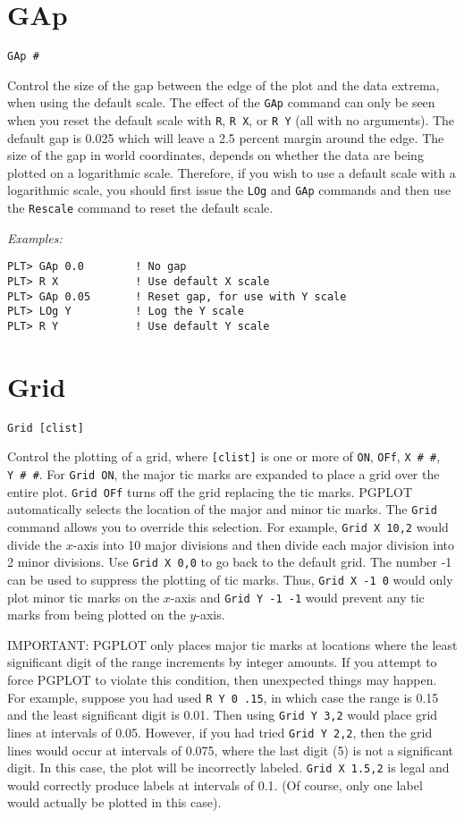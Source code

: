 \section*{GAp}
\begin{verbatim}
GAp #
\end{verbatim}
   Control the size of the gap between the edge of the plot and the
data extrema, when using the default scale.  The effect of the {\tt GAp}
command can only be seen when you reset the default scale with {\tt R},
{\tt R~X}, or {\tt R~Y} (all with no arguments).  The default gap is 0.025
which will leave a 2.5 percent margin around the edge.
The size of the gap in world coordinates, depends on whether the data
are being plotted on a logarithmic scale.  Therefore, if you wish
to use a default scale with a logarithmic scale, you should first
issue the {\tt LOg} and {\tt GAp} commands and then use the {\tt Rescale} command
to reset the default scale.

\medskip\noindent
{\em Examples:}
\begin{verbatim}
PLT> GAp 0.0        ! No gap
PLT> R X            ! Use default X scale
PLT> GAp 0.05       ! Reset gap, for use with Y scale
PLT> LOg Y          ! Log the Y scale
PLT> R Y            ! Use default Y scale
\end{verbatim}

\section*{Grid}
\begin{verbatim}
Grid [clist]
\end{verbatim}
   Control the plotting of a grid, where {\tt [clist]} is one or more of
{\tt ON}, {\tt OFf}, {\tt X~\#~\#}, {\tt Y~\#~\#}.  For {\tt Grid~ON}, the major tic marks are
expanded to place a grid over the entire plot.  {\tt Grid~OFf} turns off
the grid replacing the tic marks.  PGPLOT automatically selects the
location of the major and minor tic marks.  The {\tt Grid} command allows you to
override this selection.  For example, {\tt Grid~X~10,2}  would divide
the $x$-axis into 10 major divisions and then divide each major division
into 2 minor divisions.  Use {\tt Grid~X~0,0} to go back to the default
grid.  The number -1 can be used to suppress the plotting of tic marks.
Thus, {\tt Grid~X~-1~0} would only plot minor tic marks on the $x$-axis
and {\tt Grid~Y~-1~-1} would prevent any tic marks from being plotted on
the $y$-axis.

IMPORTANT:  PGPLOT only places major tic marks at locations where
the least significant digit of the range increments by integer amounts.
If you attempt to force PGPLOT to violate this condition, then
unexpected things may happen.  For example, suppose you had used
{\tt R~Y~0~.15}, in which case the range is 0.15 and the least significant
digit is 0.01.  Then using {\tt Grid~Y~3,2}  would place grid lines at
intervals of 0.05.  However, if you had tried {\tt Grid~Y~2,2}, then the
grid lines would occur at intervals of 0.075, where the last digit
(5) is not a significant digit.  In this case, the plot will be
incorrectly labeled.  {\tt Grid~X~1.5,2} is legal and would correctly
produce labels at intervals of 0.1. (Of course, only one label would
actually be plotted in this case).

